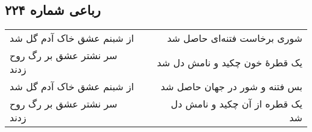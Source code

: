 \begin{center}
\section*{رباعی شماره ۲۲۴}
\label{sec:sh224}
\begin{longtable}{l p{0.5cm} r}
از شبنم عشق خاک آدم گل شد
&&
شوری برخاست فتنه‌ای حاصل شد
\\
سر نشتر عشق بر رگ روح زدند
&&
یک قطرهٔ خون چکید و نامش دل شد
\\
از شبنم عشق خاک آدم گل شد
&&
بس فتنه و شور در جهان حاصل شد
\\
سر نشتر عشق بر رگ روح زدند
&&
یک قطره از آن چکید و نامش دل شد
\\
\end{longtable}
\end{center}
